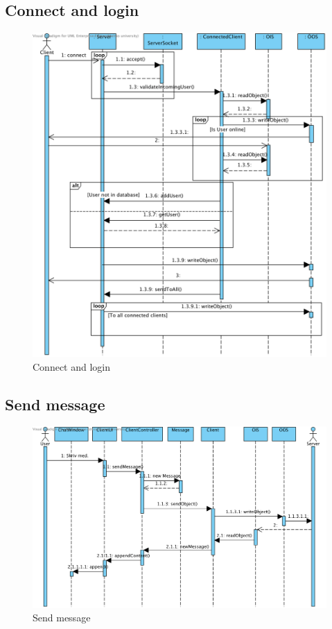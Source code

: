 \documentclass[a4paper,11pt]{article}
\begin{document}
\subsection{Connect and login}
	\begin{figure}[H]
		\centering
		\includegraphics[width=\textwidth]{diagram/Server_ConnectAndLogin.png}
		\caption{Connect and login}
	\end{figure}


\subsection{Send message}
\begin{figure}[H]
		\centering
		\includegraphics[width=\textwidth]{diagram/Client_sendMessage.png}
		\caption{Send message}
	\end{figure}
\end{document}
